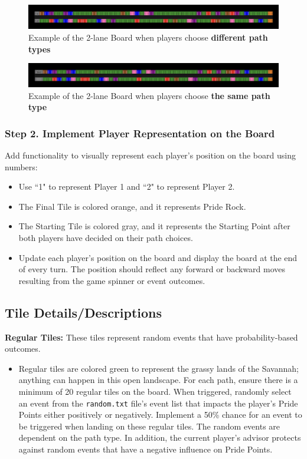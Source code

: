 \begin{figure}[h!]
    \centering
    \includegraphics[width=1\linewidth]{images/BoardExample.png}
    \caption{Example of the 2-lane Board when players choose \textbf{different path types}}
\end{figure}
\begin{figure}[h!]
    \centering
    \includegraphics[width=1\linewidth]{BoardExample2.png}
    \caption{Example of the 2-lane Board when players choose \textbf{the same path type}}
\end{figure}
\subsubsection{\textbf{Step 2. Implement Player Representation on the Board}}
Add functionality to visually represent each player's position on the board using numbers:
\begin{itemize}
    \item Use ``1" to represent Player 1 and ``2" to represent Player 2.
    \item The Final Tile is colored orange, and it represents Pride Rock.
    \item The Starting Tile is colored gray, and it represents the Starting Point after both players have decided on their path choices.
    \item Update each player's position on the board and display the board at the end of every turn. The position should reflect any forward or backward moves resulting from the game spinner or event outcomes.
\end{itemize}


\subsection{Tile Details/Descriptions}
\textbf{Regular Tiles:} These tiles represent random events that have probability-based outcomes.
    \begin{itemize}
        \item Regular tiles are colored green to represent the grassy lands of the Savannah; anything can happen in this open landscape. For each path, ensure there is a minimum of 20 regular tiles on the board. When triggered, randomly select an event from the \verb|random.txt| file's event list that impacts the player's Pride Points either positively or negatively. Implement a 50\% chance for an event to be triggered when landing on these regular tiles. The random events are dependent on the path type. In addition, the current player's advisor protects against random events that have a negative influence on Pride Points.
    \end{itemize}
    
